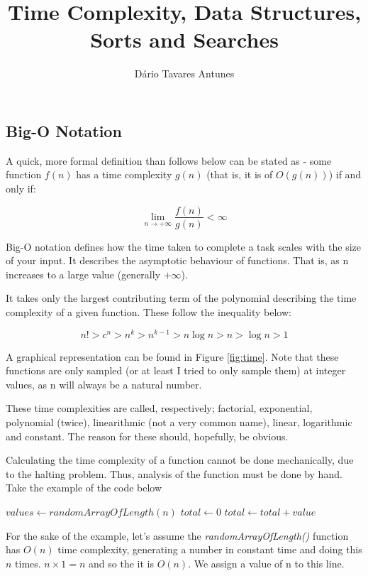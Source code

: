 \documentclass[]{article}
\title{Time Complexity, Data Structures, Sorts and Searches}
\author{D\'{a}rio Tavares Antunes}
\date{}
\begin{document}
	
\maketitle

\tableofcontents
\listoffigures

\pagebreak
{}

\subsection*{Big-O Notation}

A quick, more formal definition than follows below can be stated as - some function $f(n)$ has a time complexity $g(n)$ (that is, it is of $O(g(n))$) if and only if:

\[\lim_{n \to +\infty}\frac{f(n)}{g(n)} < \infty\]

Big-O notation defines how the time taken to complete a task scales with the size of your input. It describes the asymptotic behaviour of functions. That is, as n increases to a large value (generally $+\infty$).

It takes only the largest contributing term of the polynomial describing the time complexity of a given function. These follow the inequality below:

\[n! > c^{n} > n^{k} > n^{k-1} > n\log{n} > n > \log{n} > 1\]

A graphical representation can be found in Figure \ref{fig:time}. Note that these functions are only sampled (or at least I tried to only sample them) at integer values, as n will always be a natural number.

These time complexities are called, respectively; factorial, exponential, polynomial (twice), linearithmic (not a very common name), linear, logarithmic and constant. The reason for these should, hopefully, be obvious.

Calculating the time complexity of a function cannot be done mechanically, due to the halting problem. Thus, analysis of the function must be done by hand. Take the example of the code below

\begin{algorithmic}[1]
	\State $values \gets randomArrayOfLength(n)$
	\State $total \gets 0$
		\State $total \gets total + value$
	\EndFor
\end{algorithmic}

For the sake of the example, let's assume the \emph{randomArrayOfLength()} function has $O(n)$ time complexity, generating a number in constant time and doing this $n$ times. $n \times 1 = n$ and so the it is $O(n)$. We assign a value of n to this line.
\end{document}
